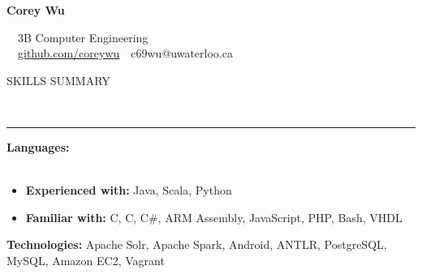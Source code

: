 \documentclass[11pt, letterpaper, oneside]{article}
\makeatletter
\newcommand{\name}{Corey Wu}
\newcommand{\program}{3B Computer Engineering}
\newcommand{\github}{\href{https://github.com/coreywu}{github.com/coreywu}}
\newcommand{\email}{c69wu@uwaterloo.ca}
\newcommand{\HRule}[2]{\textcolor{#1}{\rule{\linewidth}{#2}}}
\newcommand{\sectiontitle}[1]{\begin{minipage}{\textwidth}\vspace{-7.5pt}\begin{flushleft}\hspace{-20.5pt}\vspace{-25pt}
\Large\MakeUppercase{#1}\end{flushleft}\end{minipage}\\\HRule{black}{0.15mm}\vspace{\baselineskip}}
\newenvironment{ressection}[1]{
  \sectiontitle{#1}}
  {\vspace{-\baselineskip}}
\newcommand{\resentryheader}[4]{
    \vspace{-6pt}
    \textbf{#1}\hspace{\stretch{1}}\textcolor{black}{#3}\\
    \textit{#2}\hspace{\stretch{1}}\textcolor{black}{#4}\\
}
\newcommand{\resitem}[1]{
    \vspace{2pt}
    \item \begin{flushleft} #1 \end{flushleft}
}
\newcommand{\CPP}
{C\nolinebreak[4]\hspace{-.05em}\raisebox{.22ex}{\footnotesize\bf ++}}
\newenvironment{resentry}[4]{
  \begin{minipage}{\textwidth}
  \vspace{-3pt}
    \resentryheader{#1}{#2}{#3}{#4}
        \vspace{-\baselineskip}
    \begin{itemize}[noitemsep,nolistsep]
}{
    \end{itemize}
        \vspace{\baselineskip}
        \end{minipage}
}
\makeatother
\begin{document}
\begin{center}
	{\Huge \textbf{\name}}

	\ \ {\Large{\program}} \\
	\ \ \github \ \textbullet \ \email \ \
\end{center}

\vspace{-20pt}

\begin{ressection}{Skills Summary}
  \begin{resentry}{{Languages:}}{}{}{}
	\vspace{-15pt}    
    \resitem{\textbf{Experienced with:} Java, Scala, Python}
    \vspace{-2pt}
    \resitem{\textbf{Familiar with:} C, \CPP, C\#, ARM Assembly, JavaScript, PHP, Bash, VHDL}
    \vspace{-10pt}   
  \end{resentry}  
  \hspace{-20pt} \textbf{Technologies:} Apache Solr, Apache Spark, Android, ANTLR,  PostgreSQL, MySQL, Amazon EC2, Vagrant
\end{ressection}

\vspace{14pt}
\end{document}
